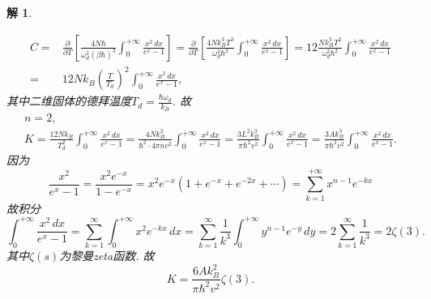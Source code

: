 \documentclass[UTF8,10pt,a4paper]{article}
\theoremstyle{Problem}
\theoremstyle{Solution}
\newtheorem*{sol}{解}
\begin{document}
\begin{sol}
\begin{itemize}
\begin{align}
            \nonumber C=&\frac{\partial}{\partial T}\left[\frac{4N\hbar}{\omega_d^2(\beta\hbar)^3}\int_0^{+\infty}\frac{x^2\,dx}{e^x-1}\right]=\frac{\partial}{\partial T}\left[\frac{4Nk_B^3T^3}{\omega_d^2\hbar^2}\int_0^{+\infty}\frac{x^2\,dx}{e^x-1}\right]=12\frac{Nk_B^3T^2}{\omega_d^2\hbar^2}\int_0^{+\infty}\frac{x^2\,dx}{e^x-1}\\
            =&12Nk_B\left(\frac{T}{T_d}\right)^2\int_0^{+\infty}\frac{x^2\,dx}{e^x-1},
        \end{align}
        其中二维固体的德拜温度$T_d=\frac{\hbar\omega_d}{k_B}$. 故
        \begin{gather}
            n=2,\\
            K=\frac{12Nk_B}{T_d^2}\int_0^{+\infty}\frac{x^2\,dx}{e^x-1}=\frac{4Nk_B^2}{\hbar^2\cdot 4\pi nv^2}\int_0^{+\infty}\frac{x^2\,dx}{e^x-1}=\frac{3L^2k_B^3}{\pi\hbar^2v^2}\int_0^{+\infty}\frac{x^2\,dx}{e^x-1}=\frac{3Ak_B^3}{\pi\hbar^2v^2}\int_0^{+\infty}\frac{x^2\,dx}{e^x-1}.
        \end{gather}
        因为
        \begin{equation}
            \frac{x^2}{e^x-1}=\frac{x^2e^{-x}}{1-e^{-x}}=x^2e^{-x}(1+e^{-x}+e^{-2x}+\cdots)=\sum_{k=1}^{+\infty}x^{n-1}e^{-kx}
        \end{equation}
        故积分
        \begin{equation}
            \int_0^{+\infty}\frac{x^2\,dx}{e^x-1}=\sum_{k=1}^{\infty}\int_0^{+\infty}x^2e^{-kx}\,dx=\sum_{k=1}^{\infty}\frac{1}{k^3}\int_0^{+\infty}y^{n-1}e^{-y}\,dy=2\sum_{k=1}^{\infty}\frac{1}{k^3}=2\zeta(3).
        \end{equation}
        其中$\zeta(s)$为黎曼zeta函数. 故
        \begin{equation}
            K=\frac{6Ak_B^2}{\pi\hbar^2v^2}\zeta(3).
        \end{equation}
    \end{itemize}
\end{sol}
\end{document}
